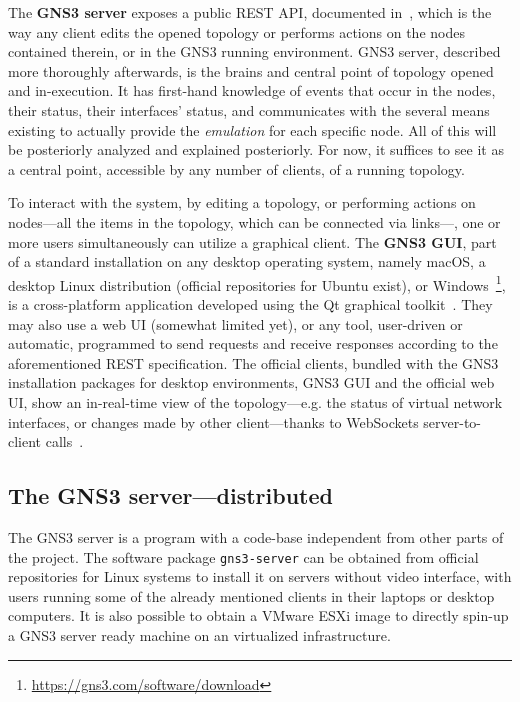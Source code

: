 The \textbf{GNS3 server} exposes a public \acrshort{REST} \acrshort{API}, documented in~\cite{gns3devarch}, which is the way any client edits the opened topology or performs actions on the nodes contained therein, or in the GNS3 running environment.
GNS3 server, described more thoroughly afterwards, is the brains and central point of topology opened and in-execution.
It has first-hand knowledge of events that occur in the nodes, their status, their interfaces' status, and communicates with the several means existing to actually provide the \emph{emulation} for each specific node.
All of this will be posteriorly analyzed and explained posteriorly.
For now, it suffices to see it as a central point, accessible by any number of clients, of a running topology.

To interact with the system, by editing a topology, or performing actions on nodes---all the items in the topology, which can be connected via links---, one or more users simultaneously can utilize a graphical client. The \textbf{GNS3 GUI}, part of a standard installation on any desktop operating system, namely macOS, a desktop Linux distribution (official repositories for Ubuntu exist), or Windows~\footnote{\url{https://gns3.com/software/download}}, is a cross-platform application developed using the Qt graphical toolkit~\cite{qttoolkit}.
They may also use a web UI (somewhat limited yet), or any tool, user-driven or automatic, programmed to send requests and receive responses according to the aforementioned REST specification.
The official clients, bundled with the GNS3 installation packages for desktop environments, GNS3 GUI and the official web UI, show an in-real-time view of the topology---e.g. the status of virtual network interfaces, or changes made by other client---thanks to WebSockets server-to-client calls~\cite{ytgns3arch22}. %



\subsection{The GNS3 server---distributed}
\label{subsec:gns3serverindetail}

The GNS3 server is a program with a code-base independent from other parts of the project.
The software package \texttt{gns3-server} can be obtained from official repositories for Linux systems to install it on servers without video interface, with users running some of the already mentioned clients in their laptops or desktop computers.
It is also possible to obtain a VMware ESXi image to directly spin-up a GNS3 server ready machine on an virtualized infrastructure.

